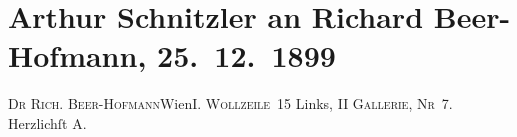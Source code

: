 

         
         \renewcommand{\erwaehntePersonen}{Personen: Richard Beer-Hofmann}
         \renewcommand{\erwaehnteOrte}{Orte: I., Innere Stadt, Wien, Wollzeile}
         \renewcommand{\erwaehnteWerke}{Werke: Gläubiger}
               \section[Arthur Schnitzler an Richard Beer-Hofmann, 25. 12. 1899]{ Arthur Schnitzler an Richard Beer-Hofmann, 25. 12. 1899}\nopagebreak{}\rehead{ }\begin{ledgroupsized}[t]{13cm}\normalsize\beginnumbering{} \toendnotes[C]{\smallbreak\pagebreak[2]} 
\toendnotes[C]{\smallbreak}\pstart{}{\pb}\textsc{Dr Rich. Beer-Hofmann}\pend{}\pstart{}Wien\pend{}\pstart{}\textsc{I. Wollzeile 15}\pend{}{\bigskip}\pstart
           \noindent{}{\pb}Links, \textsc{II
                  Gallerie, Nr 7}.\pend
           \pstart Herzlichſt \spacefill\mbox{A.}\pend{}
         
         \endnumbering{}\end{ledgroupsized}  \newcommand{\dateiname}{L01008}\newcommand{\titel}{Arthur Schnitzler an Richard Beer-Hofmann, 25. 12. 1899}\newcommand{\editorInnen}{Martin Anton Müller und Gerd-Hermann Susen}
      